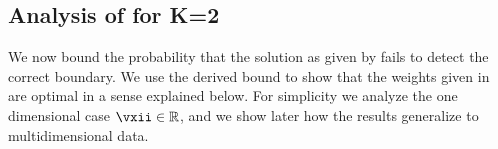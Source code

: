 \subsection{Analysis of  for K=2}\label{sec:detectionBounds}
We now bound the probability that the solution as given by  fails to detect the correct boundary. We use the derived bound to show that the weights given in  are optimal in a sense explained below.
For simplicity we analyze the one dimensional case $\vxii\in\mathbb{R}$, and we show later how the results generalize to multidimensional data.

